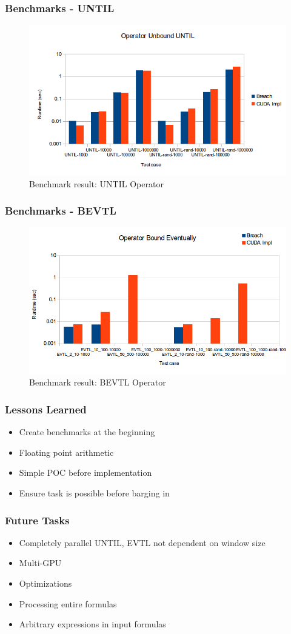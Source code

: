 \documentclass[notes=show]{beamer}
\begin{document}
\begin{frame}
\frametitle{Benchmarks - UNTIL}
\begin{figure}[H]
    \includegraphics[scale=0.5]{bm_until.png}
    \caption{
        \label{fig:bm_until}
        Benchmark result: UNTIL Operator}
\end{figure}
\end{frame}

\begin{frame}
\frametitle{Benchmarks - BEVTL}
\begin{figure}[H]
    \includegraphics[scale=0.4]{bm_bevtl.png}
    \caption{
        \label{fig:bm_bevtl}
        Benchmark result: BEVTL Operator}
\end{figure}
\end{frame}

\begin{frame}
\frametitle{Lessons Learned}
\begin{itemize}
\item Create benchmarks at the beginning
\item Floating point arithmetic
\item Simple POC before implementation
\item Ensure task is possible before barging in
\end{itemize}
\end{frame}

\begin{frame}
\frametitle{Future Tasks}
\begin{itemize}
\item Completely parallel UNTIL, EVTL not dependent on window size
\item Multi-GPU
\item Optimizations
\item Processing entire formulas
\item Arbitrary expressions in input formulas
\end{itemize}
\end{frame}
\end{document}
